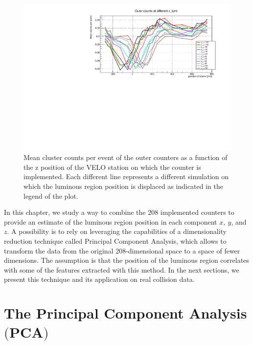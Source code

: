 \begin{figure}
    \centering
    \includegraphics[width=\textwidth]{figures/z_lumi_dependency.pdf}
    \caption{Mean cluster counts per event of the outer counters as a function of the z position of the VELO station on which the counter is implemented. Each different line represents a different simulation on which the luminous region position is displaced as indicated in the legend of the plot.}
    \label{fig:z_lumi_dependency}
\end{figure}

In this chapter, we study a way to combine the 208 implemented counters to provide an estimate of the luminous region position in each component $x,\ y$, and $z$. A possibility is to rely on leveraging the capabilities of a dimensionality reduction technique called Principal Component Analysis, which allows to transform the data from the original 208-dimensional space to a space of fewer dimensions. The assumption is that the position of the luminous region correlates with some of the features extracted with this method. In the next sections, we present this technique 
and its application on real collision data.



\section[The Principal Component Analysis]{The Principal Component Analysis $\bigl($PCA$\bigr)$}\label{sec:PCA}

